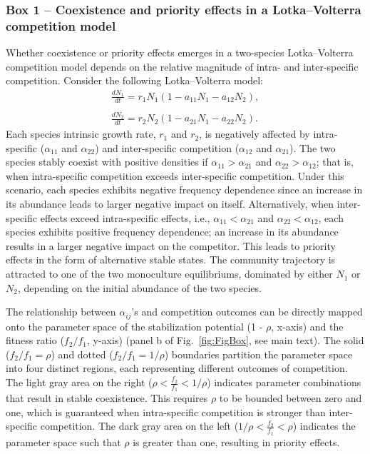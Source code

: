 \newpage
\begin{tcolorbox}[breakable, colback=white, leftright skip=-0.5cm]
	\label{fig:Box}
	\subsubsection*{Box 1 -- Coexistence and priority effects in a Lotka--Volterra competition model}
	Whether coexistence or priority effects emerges in a two-species Lotka--Volterra competition model depends on the relative magnitude of intra- and inter-specific competition. Consider the following Lotka--Volterra model:
	\begin{align*}
	\frac{dN_{1}}{dt}=r_{1}N_{1}\left ( 1-a_{11}N_{1}-a_{12}N_{2} \right ), \tag{3.5}\label{eq:LV1}
	\\~\\
	\frac{dN_{2}}{dt}=r_{2}N_{2}\left ( 1-a_{21}N_{1}-a_{22}N_{2} \right ). \tag{3.6}\label{eq:LV2}
	\end{align*}
	Each species intrinsic growth rate, $r_{1}$ and $r_{2}$, is negatively affected by intra-specific ($\alpha_{11}$ and $\alpha_{22}$) and inter-specific competition ($\alpha_{12}$ and $\alpha_{21}$). The two species stably coexist with positive densities if $\alpha_{11} > \alpha_{21}$ and $\alpha_{22} > \alpha_{12}$; that is, when intra-specific competition exceeds inter-specific competition. Under this scenario, each species exhibits negative frequency dependence since an increase in its abundance leads to larger negative impact on itself. Alternatively, when inter-specific effects exceed intra-specific effects, i.e., $\alpha_{11} < \alpha_{21}$ and $\alpha_{22} < \alpha_{12}$, each species exhibits positive frequency dependence; an increase in its abundance results in a larger negative impact on the competitor. This leads to priority effects in the form of alternative stable states. The community trajectory is attracted to one of the two monoculture equilibriums, dominated by either $N_{1}$ or $N_{2}$, depending on the initial abundance of the two species.
	\par
	
	
	The relationship between $\alpha_{ij}$'s and competition outcomes can be directly mapped onto the parameter space of the stabilization potential (1 - $\rho$, x-axis) and the fitness ratio ($f_{2}/f_{1}$, y-axis) (panel b of Fig.~\ref{fig:FigBox}, see main text). The solid ($f_{2}/f_{1} = \rho$) and dotted ($f_{2}/f_{1} = 1/\rho$) boundaries partition the parameter space into four distinct regions, each representing different outcomes of competition. The light gray area on the right ($\rho < \frac{f_{2}}{f_{1}} < 1/\rho$) indicates parameter combinations that result in stable coexistence. This requires $\rho$ to be bounded between zero and one, which is guaranteed when intra-specific competition is stronger than inter-specific competition. The dark gray area on the left ($1/\rho < \frac{f_{2}}{f_{1}} < \rho$) indicates the parameter space such that $\rho$ is greater than one, resulting in priority effects. 
\end{tcolorbox}
